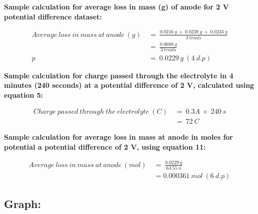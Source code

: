 \documentclass[11pt, a4]{article}
\begin{document}
			\textbf{Sample calculation for average loss in mass (g) of anode for 2 V potential difference dataset:}
			
			\begin{equation*}
				\begin{split}
					Average \ loss \ in \ mass \ at \ anode \ (g) \ &= \ \frac{0.0216 \ g \ + \ 0.0239 \ g \ + \ 0.0233 \ g}{3 \ trials}\\
					&= \ \frac{0.0688 \ g}{3 \ trials}\\p
					&= \ 0.0229 \ g \ (4 \ d.p)
				\end{split}
			\end{equation*}
			
			\textbf{Sample calculation for charge passed through the electrolyte in 4 minutes (240 seconds) at a potential difference of 2 V, calculated using equation 5:}
			
			\begin{equation*}
				\begin{split}
					Charge \ passed \ through \ the \ electrolyte \ (C) \ &= \ 0.3 A \ \times \ 240 \ s \\
					&= \ 72 \ C
				\end{split}
			\end{equation*}
			
			\textbf{Sample calculation for average loss in mass at anode in moles for potential a potential difference of 2 V, using equation 11:}
			
			\begin{equation*}
				\begin{split}
					Average \ loss \ in \ mass \ at \ anode \ (mol) \ &= \ \frac{0.0229 \ g}{63.55 \ u}\\
					&= 0.000361 \ mol \ (6 \ d.p)
				\end{split}
			\end{equation*}

		\subsection{Graph:}
		
\end{document}
